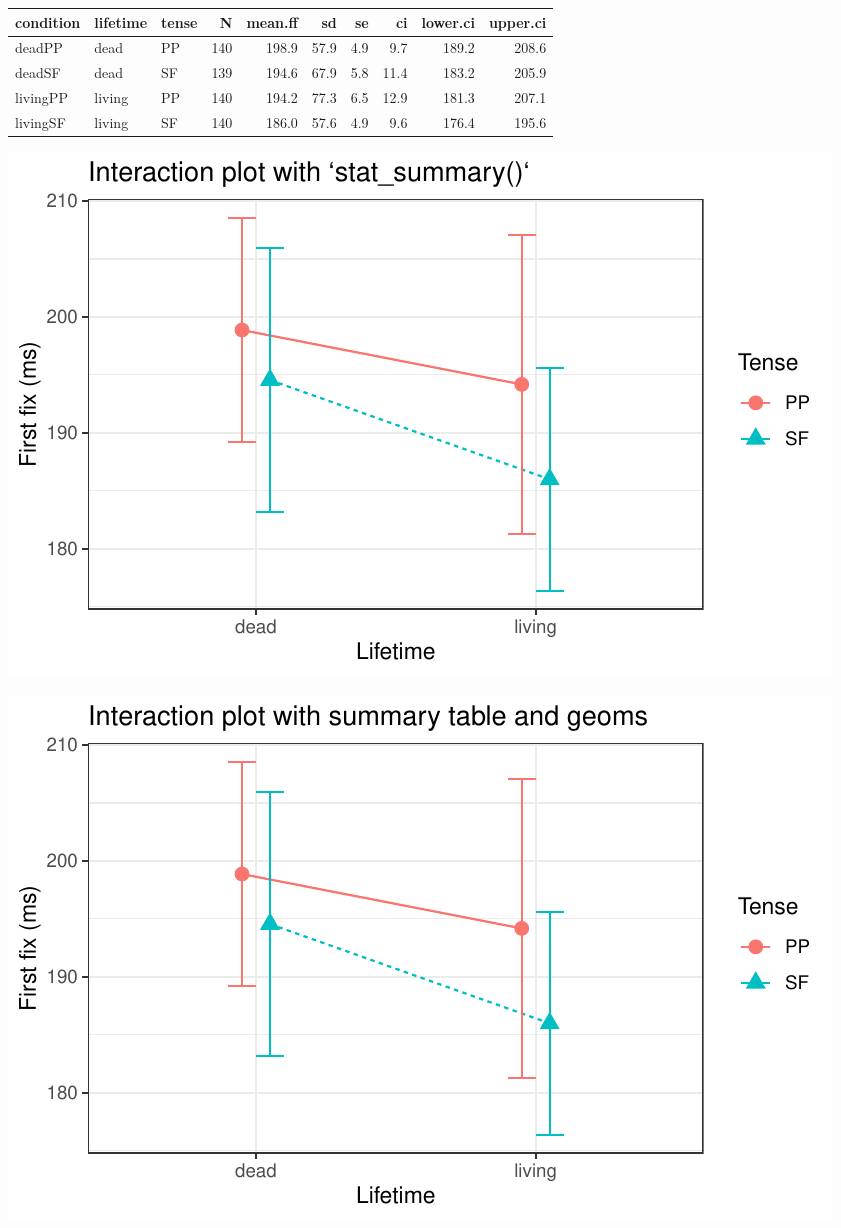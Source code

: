 \documentclass[
  letterpaper,
  DIV=11,
  numbers=noendperiod]{scrartcl}
\begin{document}
\begin{tabular}{l|l|l|r|r|r|r|r|r|r}
\hline
condition & lifetime & tense & N & mean.ff & sd & se & ci & lower.ci & upper.ci\\
\hline
deadPP & dead & PP & 140 & 198.9 & 57.9 & 4.9 & 9.7 & 189.2 & 208.6\\
\hline
deadSF & dead & SF & 139 & 194.6 & 67.9 & 5.8 & 11.4 & 183.2 & 205.9\\
\hline
livingPP & living & PP & 140 & 194.2 & 77.3 & 6.5 & 12.9 & 181.3 & 207.1\\
\hline
livingSF & living & SF & 140 & 186.0 & 57.6 & 4.9 & 9.6 & 176.4 & 195.6\\
\hline
\end{tabular}

\includegraphics{_data_viz_files/figure-pdf/unnamed-chunk-34-1.pdf}

\includegraphics{_data_viz_files/figure-pdf/unnamed-chunk-35-1.pdf}
\end{document}
